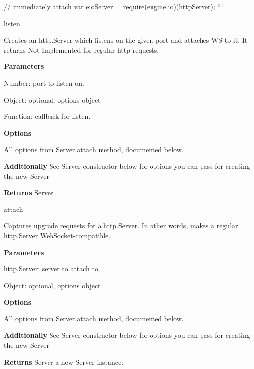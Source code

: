\begin{DoxyItemize}
// immediately attach var eio\+Server = require(\textquotesingle{}engine.\+io\textquotesingle{})(http\+Server); ```
\item {\ttfamily listen}
\begin{DoxyItemize}
\item Creates an {\ttfamily http.\+Server} which listens on the given port and attaches WS to it. It returns { Not Implemented} for regular http requests.
\item {\bfseries Parameters}
\begin{DoxyItemize}
\item {\ttfamily Number}\+: port to listen on.
\item {\ttfamily Object}\+: optional, options object
\item {\ttfamily Function}\+: callback for {\ttfamily listen}.
\end{DoxyItemize}
\item {\bfseries Options}
\begin{DoxyItemize}
\item All options from {\ttfamily Server.\+attach} method, documented below.
\item {\bfseries Additionally} See Server {\ttfamily constructor} below for options you can pass for creating the new Server
\end{DoxyItemize}
\item {\bfseries Returns} {\ttfamily Server}
\end{DoxyItemize}
\item {\ttfamily attach}
\begin{DoxyItemize}
\item Captures {\ttfamily upgrade} requests for a {\ttfamily http.\+Server}. In other words, makes a regular http.\+Server Web\+Socket-\/compatible.
\item {\bfseries Parameters}
\begin{DoxyItemize}
\item {\ttfamily http.\+Server}\+: server to attach to.
\item {\ttfamily Object}\+: optional, options object
\end{DoxyItemize}
\item {\bfseries Options}
\begin{DoxyItemize}
\item All options from {\ttfamily Server.\+attach} method, documented below.
\item {\bfseries Additionally} See Server {\ttfamily constructor} below for options you can pass for creating the new Server
\end{DoxyItemize}
\item {\bfseries Returns} {\ttfamily Server} a new Server instance.
\end{DoxyItemize}
\end{DoxyItemize}



